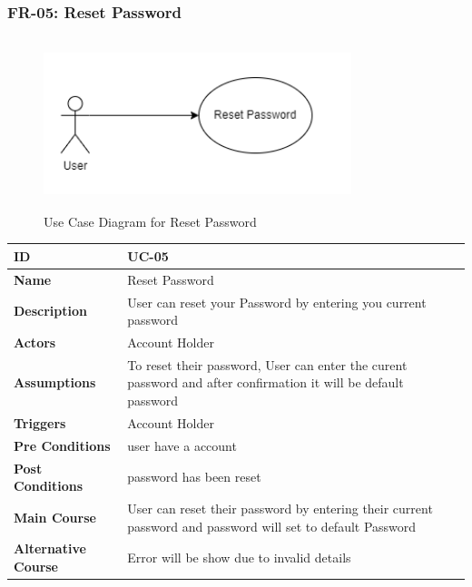     \subsubsection{FR-05: Reset Password}
    \begin{figure}[H]
        \includegraphics[height=5cm, width=0.8\textwidth]{./diagrams/Use Case/u5.png}
        \centering 
        \caption{Use Case Diagram for Reset Password}
        \label{fig:Usecase1}
        \end{figure}
        
    \begin{center}
        \begin{tabularx}{\textwidth}{|l|X|}
            \hline
            \textbf{ID} & UC-05 \\
            \hline
            \textbf{Name} & Reset Password \\
            \hline
            \textbf{Description} & User can reset your Password by entering you current password \\
            \hline
            \textbf{Actors} & Account Holder \\
            \hline
            \textbf{Assumptions} & To reset their password, User can enter the curent password and after confirmation it will be default password  \\
            \hline
            \textbf{Triggers} & Account Holder \\
            \hline
            \textbf{Pre Conditions} & user have a account \\
            \hline
            \textbf{Post Conditions} & password has been reset \\
            \hline
            \textbf{Main Course} & User can reset their password by entering their current password and password will set to default Password \\
            \hline
            \textbf{Alternative Course} & Error will be show due to invalid details \\
            \hline
            
        \end{tabularx}
    \end{center}
    \newpage
    

